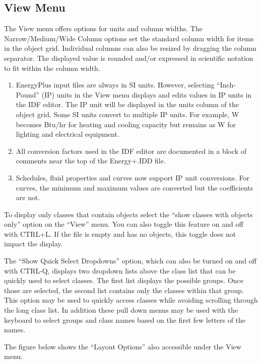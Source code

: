 \subsection{View Menu}\label{view-menu-000}

The View menu offers options for units and column widths. The Narrow/Medium/Wide Column options set the standard column width for items in the object grid. Individual columns can also be resized by dragging the column separator. The displayed value is rounded and/or expressed in scientific notation to fit within the column width.

\begin{enumerate}
\def\labelenumi{\arabic{enumi})}
\item
  EnergyPlus input files are always in SI units. However, selecting ``Inch-Pound'' (IP) units in the View menu displays and edits values in IP units in the IDF editor. The IP unit will be displayed in the units column of the object grid. Some SI units convert to multiple IP units. For example, W becomes Btu/hr for heating and cooling capacity but remains as W for lighting and electrical equipment.
\item
  All conversion factors used in the IDF editor are documented in a block of comments near the top of the Energy+.IDD file.
\item
  Schedules, fluid properties and curves now support IP unit conversions. For curves, the minimum and maximum values are converted but the coefficients are not.
\end{enumerate}

To display only classes that contain objects select the ``show classes with objects only'' option on the ``View'' menu. You can also toggle this feature on and off with CTRL+L. If the file is empty and has no objects, this toggle does not impact the display.

The ``Show Quick Select Dropdowns'' option, which can also be turned on and off with CTRL-Q, displays two dropdown lists above the class list that can be quickly used to select classes. The first list displays the possible groups. Once those are selected, the second list contains only the classes within that group. This option may be used to quickly access classes while avoiding scrolling through the long class list. In addition these pull down menus may be used with the keyboard to select groups and class names based on the first few letters of the names.

The figure below shows the ``Layout Options'' also accessible under the View menu.

